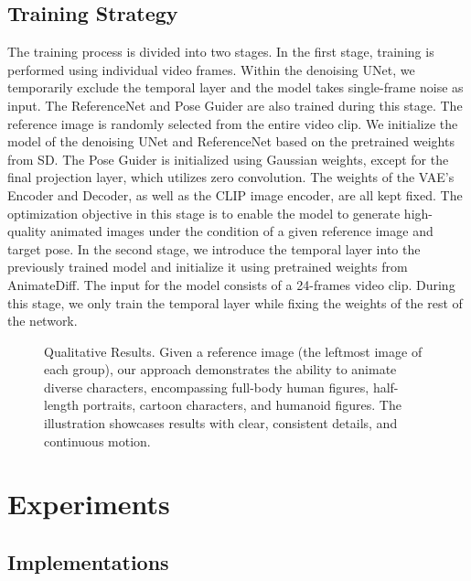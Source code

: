 \subsection{Training Strategy}\label{sec:train}
The training process is divided into two stages. In the first stage, training is performed using individual video frames. Within the denoising UNet, we temporarily exclude the temporal layer and the model takes single-frame noise as input. The ReferenceNet and Pose Guider are also trained during this stage. The reference image is randomly selected from the entire video clip. We initialize the model of the denoising UNet and ReferenceNet based on the pretrained weights from SD. The Pose Guider is initialized using Gaussian weights, except for the final projection layer, which utilizes zero convolution. The weights of the VAE's Encoder and Decoder, as well as the CLIP image encoder, are all kept fixed. The optimization objective in this stage is to enable the model to generate high-quality animated images under the condition of a given reference image and target pose.
In the second stage, we introduce the temporal layer into the previously trained model and initialize it using pretrained weights from AnimateDiff\cite{animatediff}. The input for the model consists of a 24-frames video clip. During this stage, we only train the temporal layer while fixing the weights of the rest of the network. 

\begin{figure*}[!t]
\begin{center}
	\setlength{\fboxrule}{0pt}
\end{center}
\vspace{-0.6cm}
\caption{Qualitative Results. Given a reference image (the leftmost image of each group), our approach demonstrates the ability to animate diverse characters, encompassing full-body human figures, half-length portraits, cartoon characters, and humanoid figures. The illustration showcases results with clear, consistent details, and continuous motion. }
\vspace{-0.2cm}
\label{fig:vis}
\end{figure*}

\section{Experiments}

\subsection{Implementations}

